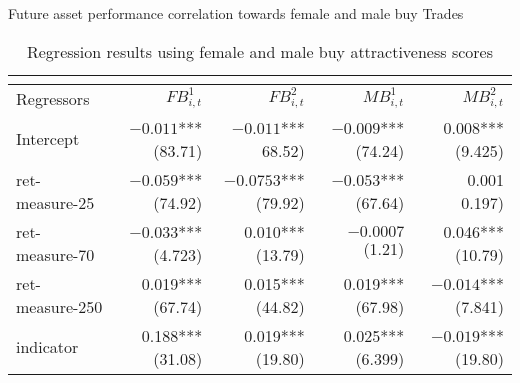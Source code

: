 \documentclass{beamer}
\begin{document}
\begin{frame}{Future asset performance correlation towards female and male buy Trades}

\begin{table}[htbp]
    \centering
    \caption{Regression results using female and male buy attractiveness scores}
    \label{tab:FB-MB}
     \tiny
\begin{tabular}{ lrrrr } 
 \multicolumn{1}{c}{} \\
 \toprule
 Regressors & $FB^1_{i,t}$ & $FB^2_{i,t}$ & $MB^1_{i,t}$ & $MB^2_{i,t}$  \\ 
  \midrule
Intercept  & \shortstack{$-0.011$*** \\ (83.71)} & \shortstack{$-0.011$*** \\ 68.52)} & \shortstack{$-0.009$*** \\ (74.24)} &  \shortstack{0.008*** \\ (9.425)}\\

ret-measure-25  & \shortstack{$-0.059$*** \\ (74.92)}& \shortstack{$-0.0753$*** \\ (79.92)} & \shortstack{$-0.053$*** \\ (67.64)} &  \shortstack{0.001 \\ 0.197)}\\

ret-measure-70  & \shortstack{$-0.033$*** \\ (4.723)} & \shortstack{0.010*** \\ (13.79)} & \shortstack{$-0.0007$ \\ (1.21)} & \shortstack{0.046*** \\ (10.79)} \\

ret-measure-250 & \shortstack{ 0.019*** \\ (67.74)}& \shortstack{0.015*** \\ (44.82)} & \shortstack{0.019*** \\ (67.98)} & \shortstack{$-0.014$*** \\ (7.841)}\\

indicator & \shortstack{0.188*** \\ (31.08)}& \shortstack{0.019*** \\ (19.80)} &\shortstack{0.025*** \\ (6.399)} & \shortstack{$-0.019$*** \\ (19.80)}\\


\end{tabular}
\end{table}
\end{frame}
\end{document}
